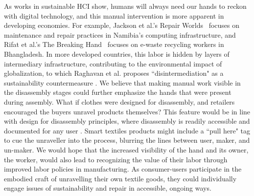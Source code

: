 As works in sustainable HCI show, humans will always need our hands to reckon with digital technology, and this manual intervention is more apparent in developing economies. For example, Jackson et al.'s Repair Worlds~\cite{jackson_repair_2012} focuses on maintenance and repair practices in Namibia's computing infrastructure, and Rifat et al.'s The Breaking Hand~\cite{rifat_breaking_2019} focuses on e-waste recycling workers in Bhangladesh. In more developed countries, this labor is hidden by layers of intermediary infrastructure, contributing to the environmental impact of globalization, to which Raghavan et al. proposes ``disintermediation" as a sustainability countermeasure \cite{raghavan_means_2017}. We believe that making manual work visible in the disassembly stages could further emphasize the hands that were present during assembly. What if clothes were designed for disassembly, and retailers encouraged the buyers unravel products themselves? This feature would be in line with design for disassembly principles, where disassembly is readily accessible and documented for any user \cite{webster_dfd}. Smart textiles products might include a ``pull here" tag to cue the unraveller into the process, blurring the lines between user, maker, and un-maker. We would hope that the increased visibility of the hand and its owner, the worker, would also lead to recognizing the value of their labor through improved labor policies in manufacturing. As consumer-users participate in the embodied craft of unravelling their own textile goods, they could individually engage issues of sustainability and repair in accessible, ongoing ways.




